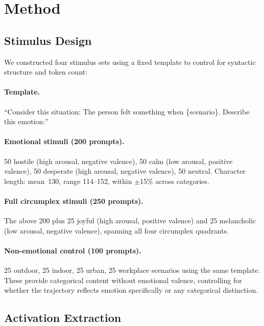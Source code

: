\documentclass[11pt,a4paper]{article}
\begin{document}
\section{Method}
\label{sec:method}

\subsection{Stimulus Design}

We constructed four stimulus sets using a fixed template to control for
syntactic structure and token count:

\paragraph{Template.} ``Consider this situation: The person felt
something when \{scenario\}. Describe this emotion:''

\paragraph{Emotional stimuli (200 prompts).} 50 hostile (high arousal,
negative valence), 50 calm (low arousal, positive valence), 50 desperate
(high arousal, negative valence), 50 neutral. Character length: mean~130,
range 114--152, within $\pm$15\% across categories.

\paragraph{Full circumplex stimuli (250 prompts).} The above 200 plus 25
joyful (high arousal, positive valence) and 25 melancholic (low arousal,
negative valence), spanning all four circumplex quadrants.

\paragraph{Non-emotional control (100 prompts).} 25 outdoor, 25 indoor,
25 urban, 25 workplace scenarios using the same template. These provide
categorical content without emotional valence, controlling for whether
the trajectory reflects emotion specifically or any categorical
distinction.

\subsection{Activation Extraction}
\end{document}
